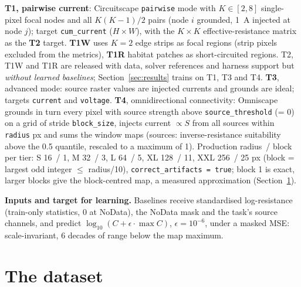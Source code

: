 \documentclass{article}
\newcommand{\code}[1]{\texttt{#1}}
\begin{document}
\textbf{T1, pairwise current}: Circuitscape \code{pairwise} mode with $K\in[2,8]$ single-pixel focal nodes and all $K(K-1)/2$ pairs (node $i$ grounded, 1~A injected at node $j$); target \code{cum\_current} ($H\times W$), with the $K\times K$ effective-resistance matrix as the \textbf{T2} target. \textbf{T1W} uses $K=2$ edge strips as focal regions (strip pixels excluded from the metrics), \textbf{T1R} habitat patches as short-circuited regions. T2, T1W and T1R are released with data, solver references and harness support but \emph{without learned baselines}; Section~\ref{sec:results} trains on T1, T3 and T4. \textbf{T3}, advanced mode: source raster values are injected currents and grounds are ideal; targets \code{current} and \code{voltage}. \textbf{T4}, omnidirectional connectivity: Omniscape grounds in turn every pixel with source strength above \code{source\_threshold} (= 0) on a grid of stride \code{block\_size}, injects current $\propto S$ from all sources within \code{radius} px and sums the window maps (sources: inverse-resistance suitability above the 0.5 quantile, rescaled to a maximum of 1). Production radius~/ block per tier: S 16~/ 1, M 32~/ 3, L 64~/ 5, XL 128~/ 11, XXL 256~/ 25 px (block = largest odd integer $\le$ radius/10), \code{correct\_artifacts = true}; block 1 is exact, larger blocks give the block-centred map, a measured approximation (Section~\ref{sec:data}).

\textbf{Inputs and target for learning.} Baselines receive standardised log-resistance (train-only statistics, 0 at NoData), the NoData mask and the task's source channels, and predict $\log_{10}(C+\epsilon\cdot\max C)$, $\epsilon=10^{-6}$, under a masked MSE: scale-invariant, 6 decades of range below the map maximum.

\section{The dataset}
\label{sec:data}


\end{document}
